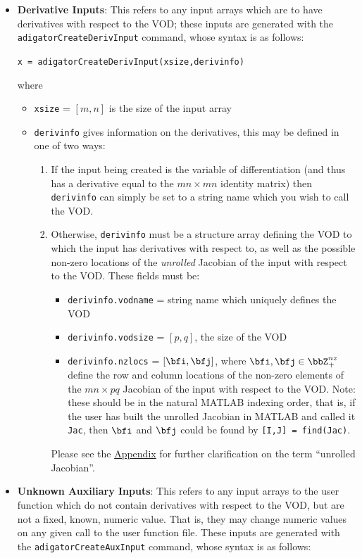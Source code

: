 \documentclass[10pt,pdftex]{article}
\begin{document}
\begin{itemize}


\item {\bf Derivative Inputs}: This refers to any input arrays which are to have derivatives with respect to the VOD; these inputs are generated with the \texttt{adigatorCreateDerivInput} command, whose syntax is as follows:\\
\centerline{\texttt{x = adigatorCreateDerivInput(xsize,derivinfo)}}
where
\begin{itemize}
\item \texttt{xsize} = $[m,n]$ is the size of the input array
\item \texttt{derivinfo} gives information on the derivatives, this may be defined in one of two ways:\\
\begin{enumerate}
\item If the input being created is the variable of differentiation (and thus has a derivative equal to the $mn \times mn$ identity matrix) then \texttt{derivinfo} can simply be set to a string name which you wish to call the VOD.
\item Otherwise, \texttt{derivinfo} must be a structure array defining the VOD to which the input has derivatives with respect to, as well as the possible non-zero locations of the \emph{unrolled} Jacobian of the input with respect to the VOD. These fields must be:
\begin{itemize}
\item \texttt{derivinfo.vodname} = string name which uniquely defines the VOD
\item \texttt{derivinfo.vodsize} = $[p,q]$, the size of the VOD
\item \texttt{derivinfo.nzlocs} = $[\bfi,\bfj]$, where $\bfi,\bfj \in \bbZ_+^{nz}$ define the row and column locations of the non-zero elements of the $mn \times pq$ Jacobian of the input with respect to the VOD. Note: these should be in the natural MATLAB indexing order, that is, if the user has built the unrolled Jacobian in MATLAB and called it \texttt{Jac}, then $\bfi$ and $\bfj$ could be found by \texttt{[I,J] = find(Jac)}. 
\end{itemize}
Please see the \hyperlink{Appendix}{Appendix} for further clarification on the term ``unrolled Jacobian''.
\end{enumerate}
\end{itemize}
\item {\bf Unknown Auxiliary Inputs}: This refers to any input arrays to the user function which do not contain derivatives with respect to the VOD, but are not a fixed, known, numeric value. That is, they may change numeric values on any given call to the user function file. These inputs are generated with the \texttt{adigatorCreateAuxInput} command, whose syntax is as follows:\\

\end{itemize}
\end{document}
